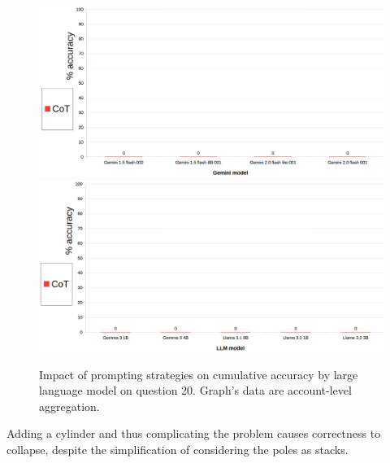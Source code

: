 \documentclass[12pt]{article}
\begin{document}
\begin{figure}[H]
    \centering
            \includegraphics[width=1\textwidth]{q310Gemini.png}
            \includegraphics[width=1\textwidth]{q310Other.png}
    \caption[Accuracy on Question 20 by LLM]{Impact of prompting strategies on cumulative accuracy by large language model on question 20. Graph's data are account-level aggregation.}
    \end{figure} 
Adding a cylinder and thus complicating the problem causes correctness to collapse, despite the simplification of considering the poles as stacks.\\
\vspace{2cm}
\end{document}
